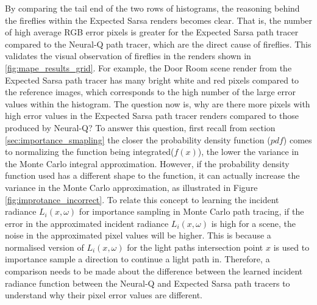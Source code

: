 \documentclass[../dissertation.tex]{subfiles}
\begin{document}
By comparing the tail end of the two rows of histograms, the reasoning behind the fireflies within the Expected Sarsa renders becomes clear. That is, the number of high average RGB error pixels is greater for the Expected Sarsa path tracer compared to the Neural-Q path tracer, which are the direct cause of fireflies. This validates the visual observation of fireflies in the renders shown in \ref{fig:mape_results_grid}. For example, the Door Room scene render from the Expected Sarsa path tracer has many bright white and red pixels compared to the reference images, which corresponds to the high number of the large error values within the histogram. The question now is, why are there more pixels with high error values in the Expected Sarsa path tracer renders compared to those produced by Neural-Q? To answer this question, first recall from section \ref{sec:importance_smapling} the closer the probability density function ($pdf$) comes to normalizing the function being integrated($f(x)$), the lower the variance in the Monte Carlo integral approximation. However, if the probability density function used has a different shape to the function, it can actually increase the variance in the Monte Carlo approximation, as illustrated in Figure \ref{fig:improtance_incorrect}. To relate this concept to learning the incident radiance $L_i(x, \omega)$ for importance sampling in Monte Carlo path tracing, if the error in the approximated incident radiance $L_i(x, \omega)$ is high for a scene, the noise in the approximated pixel values will be higher. This is because a normalised version of $L_i(x, \omega)$ for the light paths intersection point $x$ is used to importance sample a direction to continue a light path in. Therefore, a comparison needs to be made about the difference between the learned incident radiance function between the Neural-Q and Expected Sarsa path tracers to understand why their pixel error values are different.
\end{document}

